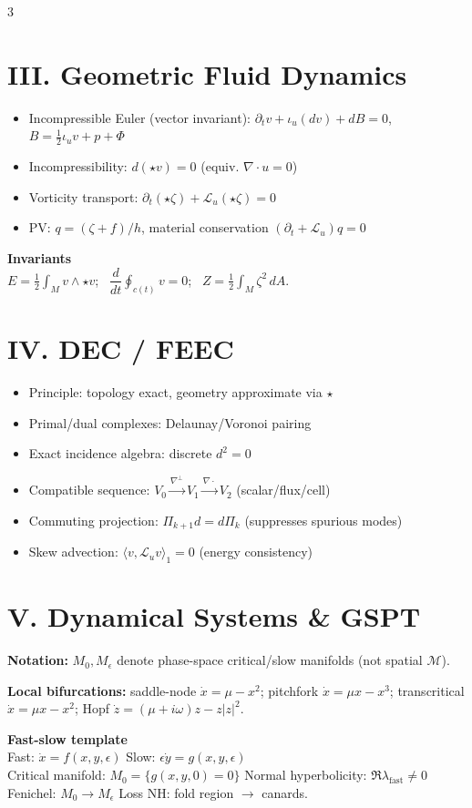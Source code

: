 \documentclass[9pt,letterpaper]{extarticle}
\newcommand{\sect}[1]{\section*{#1}}
\newcommand{\T}[1]{\textbf{#1}}
\begin{document}
\begin{multicols}{3}
\sect{III. Geometric Fluid Dynamics}
\begin{itemize}
  \item Incompressible Euler (vector invariant): $\partial_t v + \iota_u(dv) + dB = 0$, $B=\tfrac12\iota_u v + p + \Phi$
  \item Incompressibility: $d(\star v)=0$ (equiv. $\nabla\cdot u=0$)
  \item Vorticity transport: $\partial_t(\star\zeta)+\mathcal{L}_u(\star\zeta)=0$
  \item PV: $q=(\zeta+f)/h$, material conservation $(\partial_t+\mathcal{L}_u)q=0$
\end{itemize}

\T{Invariants}\\[-1pt]
$E=\tfrac12\int_M v\wedge\star v$; \ $\dfrac{d}{dt}\oint_{c(t)}v=0$; \ $Z=\tfrac12\int_M\zeta^2\,dA$.

\sect{IV. DEC / FEEC}
\begin{itemize}
  \item Principle: topology exact, geometry approximate via $\star$
  \item Primal/dual complexes: Delaunay/Voronoi pairing
  \item Exact incidence algebra: discrete $d^2=0$
  \item Compatible sequence: $V_0\xrightarrow{\nabla^\perp}V_1\xrightarrow{\nabla\cdot}V_2$ (scalar/flux/cell)
  \item Commuting projection: $\Pi_{k+1}d=d\Pi_k$ (suppresses spurious modes)
  \item Skew advection: $\langle v,\mathcal{L}_u v\rangle_1=0$ (energy consistency)
\end{itemize}

\sect{V. Dynamical Systems \& GSPT}
\T{Notation:} $M_0,M_\epsilon$ denote phase-space critical/slow manifolds (not spatial $\mathcal{M}$).

\T{Local bifurcations:} saddle-node $\dot x=\mu-x^2$; pitchfork $\dot x=\mu x-x^3$; transcritical $\dot x=\mu x-x^2$; Hopf $\dot z=(\mu+i\omega)z-z|z|^2$.

\T{Fast-slow template}\\[-1pt]
Fast: $\dot x=f(x,y,\epsilon)$ \quad
Slow: $\epsilon\dot y=g(x,y,\epsilon)$\\[-1pt]
Critical manifold: $M_0=\{g(x,y,0)=0\}$ \quad
Normal hyperbolicity: $\Re\lambda_{\text{fast}}\neq0$\\[-1pt]
Fenichel: $M_0\to M_\epsilon$ \quad
Loss NH: fold region $\to$ canards.


\end{multicols}
\end{document}
